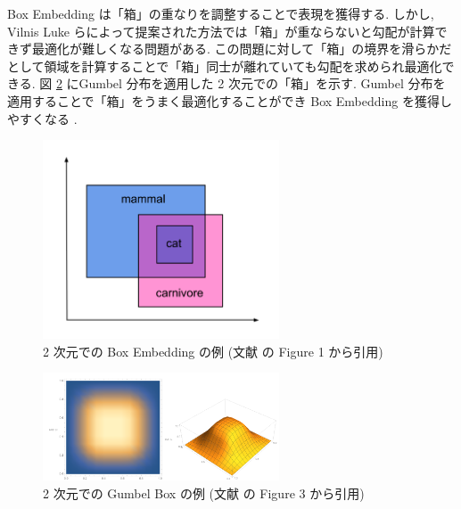 \documentclass[twocolumn]{jarticle}     %
\begin{document}
Box Embedding は「箱」の重なりを調整することで表現を獲得する. しかし, Vilnis Luke らによって提案された方法では「箱」が重ならないと勾配が計算できず最適化が難しくなる問題がある.
この問題に対して「箱」の境界を滑らかだとして領域を計算することで「箱」同士が離れていても勾配を求められ最適化できる. 
図 \ref{fig:gumbel_box} にGumbel 分布を適用した 2 次元での「箱」を示す. 
Gumbel 分布を適用することで「箱」をうまく最適化することができ Box Embedding を獲得しやすくなる \cite{gumbel-box}. 

\begin{figure}[t]
  \centering
  \label{fig:box_embedding2d}
  \includegraphics[width=70mm]{BoxEmbedding_2d.png}
  \caption{2 次元での Box Embedding の例 (文献 \cite{li2018smoothing} の Figure 1 から引用)}
\end{figure}

\begin{figure}[t]
  \centering
  \label{fig:gumbel_box}
  \includegraphics[width=70mm]{GumbelBoxes.png}
  \caption{2 次元での Gumbel Box の例 (文献 \cite{pmlr-v161-boratko21a} の Figure 3 から引用)}
\end{figure}

\end{document}
